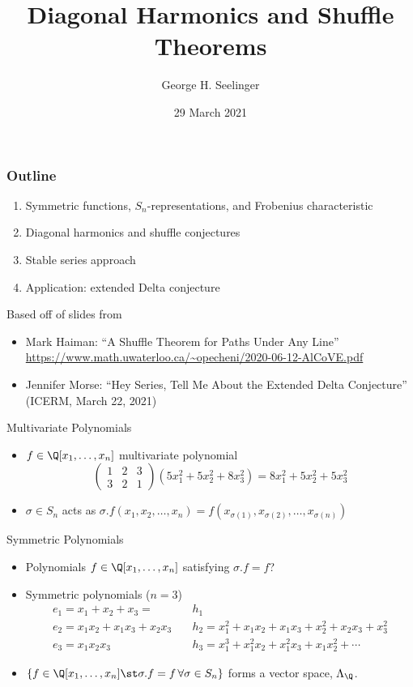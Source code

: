 \documentclass{beamer}
\title[Shuffle Theorems]{Diagonal Harmonics and Shuffle Theorems} %
\author[George H. Seelinger]{George H. Seelinger} %
\institute[UVA] %
{
  \medskip
\textit{ghs9ae@virginia.edu}\\ %
\medskip
UVA Graduate Seminar %
}
\date{29 March 2021} %
\newcommand{\sym}{\Lambda}
\begin{document}
\begin{frame}
 \titlepage 
\end{frame}
\begin{frame}
  \frametitle{Outline}
  \begin{enumerate}
  \item Symmetric functions, \(S_n\)-representations, and Frobenius characteristic
  \item Diagonal harmonics and shuffle conjectures
  \item Stable series approach
  \item Application: extended Delta conjecture
  \end{enumerate}\pause
  Based off of slides from
  \begin{itemize}
  \item Mark Haiman: ``A Shuffle Theorem for Paths Under Any Line''\\
    \url{https://www.math.uwaterloo.ca/~opecheni/2020-06-12-AlCoVE.pdf}
  \item Jennifer Morse: ``Hey Series, Tell Me About the Extended Delta
    Conjecture'' (ICERM, March 22, 2021)
  \end{itemize}
\end{frame}
\begin{frame}{Multivariate Polynomials}
  \begin{itemize}
  \item \(f \in \Q[x_1,\ldots,x_n]\) multivariate polynomial \pause
    \[
      \left(
        \begin{matrix}
          1 & 2 & 3\\
          3 & 2 & 1
        \end{matrix}
      \right) (5x_1^2+5x_2^2+8x_3^2) = 8x_1^2+5x_2^2+5x_3^2
    \]\pause
  \item \(\sigma \in S_n\) acts as \(\sigma.f(x_1,x_2,\ldots,x_n) =
    f(x_{\sigma(1)}, x_{\sigma(2)},\ldots,x_{\sigma(n)})\)
  \end{itemize}
\end{frame}
\begin{frame}{Symmetric Polynomials}
  \begin{itemize}
    \item Polynomials \(f \in \Q[x_1,\ldots,x_n]\) satisfying \(\sigma.f
    = f\)? \pause
  \item Symmetric polynomials (\(n=3\))
    \begin{align*}
      e_1 = x_1 + x_2 + x_3 = & h_1  \\
      e_2 = x_1 x_2 + x_1 x_3 + x_2 x_3 \quad & h_2 = x_1^2 + x_1 x_2 + x_1
                                          x_3 + x_2^2 +  x_2 x_3 +x_3^2  \\
      e_3 = x_1 x_2 x_3 \quad & h_3 = x_1^3 + x_1^2 x_2 + x_1^2 x_3 + x_1
                          x_2^2 + \cdots
    \end{align*} \pause
  \item \(\{f \in \Q[x_1,\ldots,x_n] \st \sigma.f = f \, \forall \sigma
    \in S_n\}\) forms a vector space, \(\sym_\Q\).
\end{itemize}
\end{frame}
\end{document}
